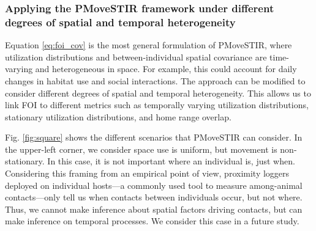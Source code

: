 \documentclass[letterpaper]{article}
\begin{document}

\subsubsection*{Applying the PMoveSTIR framework under different degrees of spatial and temporal heterogeneity}

Equation \ref{eq:foi_cov} is the most general formulation of PMoveSTIR, where utilization distributions and between-individual spatial covariance are time-varying and heterogeneous in space. For example, this could account for daily changes in habitat use and social interactions. The approach can be modified to consider different degrees of spatial and temporal heterogeneity. This allows us to link FOI to different metrics such as temporally varying utilization distributions, stationary utilization distributions, and home range overlap. 

Fig. \ref{fig:square} shows the different scenarios that PMoveSTIR can consider. In the upper-left corner, we consider space use is uniform, but movement is non-stationary. In this case, it is not important where an individual is, just when. Considering this framing from an empirical point of view, proximity loggers deployed on individual hosts---a commonly used tool to measure among-animal contacts---only tell us when contacts between individuals occur, but not where.  Thus, we cannot make inference about spatial factors driving contacts, but can make inference on temporal processes.  We consider this case in a future study.
\end{document}
